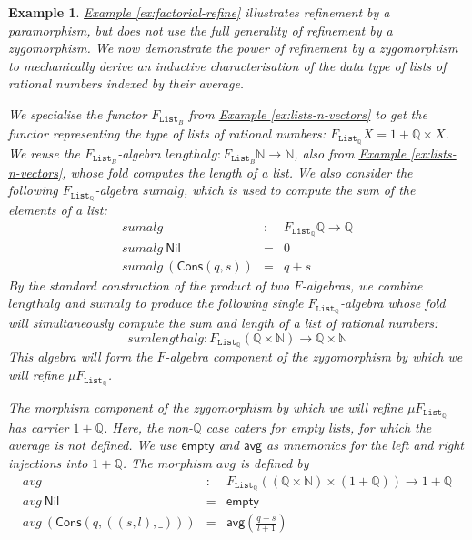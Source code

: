\documentclass{LMCS}
\newcommand{\tyname}[1]{\texttt{#1}}
\newtheorem{eorollary}{Example}
\newcommand{\exref}[1]{\hyperref[#1]{Example \ref*{#1}}}
\begin{document}
\begin{eorollary}
  \exref{ex:factorial-refine} illustrates refinement by a
  paramorphism, but does not use the full generality of refinement by
  a zygomorphism. We now demonstrate the power of refinement by a
  zygomorphism to mechanically derive an inductive characterisation of
  the data type of lists of rational numbers indexed by their average.

  We specialise the functor $F_{\tyname{List}_B}$ from
  \exref{ex:lists-n-vectors} to get the functor representing the type
  of lists of rational numbers: $F_{\tyname{List}_{\mathbb{Q}}}X = 1 +
  \mathbb{Q} \times X$. We reuse the $F_{\tyname{List}_B}$-algebra
  $\mathit{lengthalg} : F_{\tyname{List}_B} \mathbb{N} \to
  \mathbb{N}$, also from \exref{ex:lists-n-vectors}, whose fold
  computes the length of a list. We also consider the following
  $F_{\tyname{List}_{\mathbb{Q}}}$-algebra $\mathit{sumalg}$, which is
  used to compute the sum of the elements of a list:
  \[\begin{array}{lll}
    \mathit{sumalg} & : & F_{\tyname{List}_{\mathbb{Q}}}\mathbb{Q} \to
\mathbb{Q} \\
    \mathit{sumalg}\ \mathsf{Nil} & = & 0 \\
    \mathit{sumalg}\ (\mathsf{Cons}(q,s)) & = & q + s
  \end{array}\]
  By the standard construction of the product of two $F$-algebras, we
  combine $\mathit{lengthalg}$ and $\mathit{sumalg}$ to produce the
  following single $F_{\tyname{List}_{\mathbb{Q}}}$-algebra whose fold
  will simultaneously compute the sum and length of a list of rational
  numbers: 
  \begin{displaymath}
    \mathit{sumlengthalg} :
    F_{\tyname{List}_{\mathbb{Q}}}(\mathbb{Q} \times \mathbb{N}) \to
    \mathbb{Q} \times \mathbb{N}
  \end{displaymath}
  This algebra will form the $F$-algebra component of the zygomorphism
  by which we will refine $\mu F_{\tyname{List}_\mathbb{Q}}$.

  The morphism component of the zygomorphism by which we will refine
  $\mu F_{\tyname{List}_\mathbb{Q}}$ has carrier $1 +
  \mathbb{Q}$. Here, the non-$\mathbb{Q}$ case caters for empty lists,
  for which the average is not defined. We use $\mathsf{empty}$ and
  $\mathsf{avg}$ as mnemonics for the left and right injections into
  $1 + \mathbb{Q}$. The morphism $\mathit{avg}$ is defined by
 \[\begin{array}{lll}
    \mathit{avg} & : & F_{\tyname{List}_{\mathbb{Q}}}((\mathbb{Q} \times
    \mathbb{N}) \times (1 + \mathbb{Q})) \to 1 + \mathbb{Q} \\
    \mathit{avg}\ \mathsf{Nil} & = & \mathsf{empty} \\
    \mathit{avg}\ (\mathsf{Cons}(q,((s,l),\_))) & = & \mathsf{avg}(\frac{q +
      s}{l + 1})
  \end{array}\]


\end{eorollary}
\end{document}
